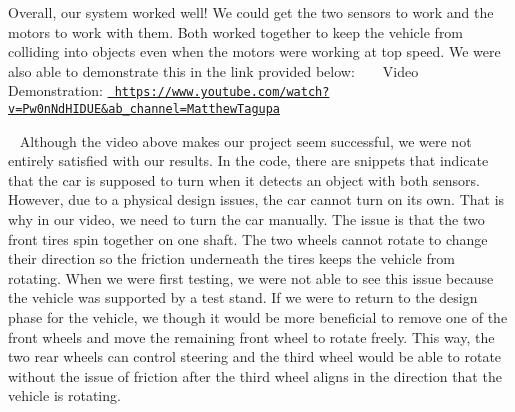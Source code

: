 Overall, our system worked well! We could get the two sensors to work and the motors to work with them. Both worked together to keep the vehicle from colliding into objects even when the motors were working at top speed. We were also able to demonstrate this in the link provided below\+: ~\newline
 ~\newline
 Video Demonstration\+: \href{https://www.youtube.com/watch?v=Pw0nNdHIDUE&ab_channel=MatthewTagupa}{\texttt{ https\+://www.\+youtube.\+com/watch?v=\+Pw0n\+Nd\+H\+I\+D\+U\+E\&ab\+\_\+channel=\+Matthew\+Tagupa}}

~\newline
 Although the video above makes our project seem successful, we were not entirely satisfied with our results. In the code, there are snippets that indicate that the car is supposed to turn when it detects an object with both sensors. However, due to a physical design issues, the car cannot turn on its own. That is why in our video, we need to turn the car manually. The issue is that the two front tires spin together on one shaft. The two wheels cannot rotate to change their direction so the friction underneath the tires keeps the vehicle from rotating. When we were first testing, we were not able to see this issue because the vehicle was supported by a test stand. If we were to return to the design phase for the vehicle, we though it would be more beneficial to remove one of the front wheels and move the remaining front wheel to rotate freely. This way, the two rear wheels can control steering and the third wheel would be able to rotate without the issue of friction after the third wheel aligns in the direction that the vehicle is rotating. ~\newline
 ~\newline
